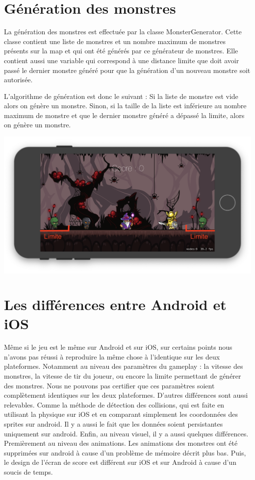 \documentclass{article}
\begin{document}
\cleardoublepage

\section{Génération des monstres}
La génération des monstres est effectuée par la classe MonsterGenerator. Cette classe contient une liste de monstres et un nombre maximum de monstres présents sur la map et qui ont été générés par ce générateur de monstres. Elle contient aussi une variable qui correspond à une distance limite que doit avoir passé le dernier monstre généré pour que la génération d'un nouveau monstre soit autorisée.

L'algorithme de génération est donc le suivant : 
Si la liste de monstre est vide alors on génère un monstre. 
Sinon, si la taille de la liste est inférieure au nombre maximum de monstre et que le dernier monstre généré a dépassé la limite, alors on génère un monstre.

\begin{center}
  \includegraphics[scale=0.4]{limite.png}
\end{center}

\section{Les différences entre Android et iOS}
Même si le jeu est le même sur Android et sur iOS, sur certains points nous n'avons pas réussi à reproduire la même chose à l'identique sur les deux plateformes. 
Notamment au niveau des paramètres du gameplay : la vitesse des monstres, la vitesse de tir du joueur, ou encore la limite permettant de générer des monstres. Nous ne pouvons pas certifier que ces paramètres soient complètement identiques sur les deux plateformes.
D'autres différences sont aussi relevables. Comme la méthode de détection des collisions, qui est faite en utilisant la physique sur iOS et en comparant simplement les coordonnées des sprites sur android. Il y a aussi le fait que les données soient persistantes uniquement sur android.
Enfin, au niveau visuel, il y a aussi quelques différences. Premièrement au niveau des animations. Les animations des monstres ont été supprimées sur android à cause d'un problème de mémoire décrit plus bas. Puis, le design de l'écran de score est différent sur iOS et sur Android à cause d'un soucis de temps.
\end{document}
